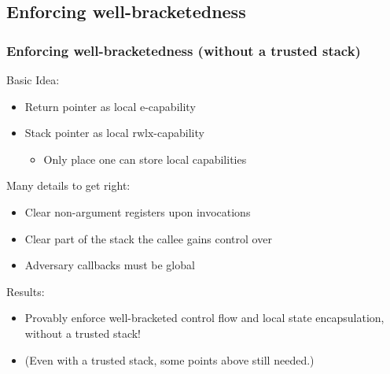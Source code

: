 \documentclass{beamer}
\newcommand{\plainperm}[1]{\mathrm{#1}}
\newcommand{\entry}{\plainperm{e}}
\newcommand{\rwlx}{\plainperm{rwlx}}
\begin{document}
\subsection{Enforcing well-bracketedness}
\begin{frame}
  \frametitle{Enforcing well-bracketedness (without a trusted stack)}
  \pause
  Basic Idea:
  \begin{itemize}
  \item Return pointer as local $\entry$-capability
  \item Stack pointer as local $\rwlx$-capability
    \begin{itemize} 
    \item Only place one can store local capabilities
    \end{itemize}
  \end{itemize}
  \pause
  Many details to get right:
  \begin{itemize}
  \item Clear non-argument registers upon invocations
  \item Clear part of the stack the callee gains control over
  \item Adversary callbacks must be global
  \end{itemize}
  \pause
  Results:
  \begin{itemize}
  \item Provably enforce well-bracketed control flow and local state
    encapsulation, without a trusted stack!
  \item (Even with a trusted stack, some points above still needed.)
  \end{itemize}
\end{frame}
\end{document}
